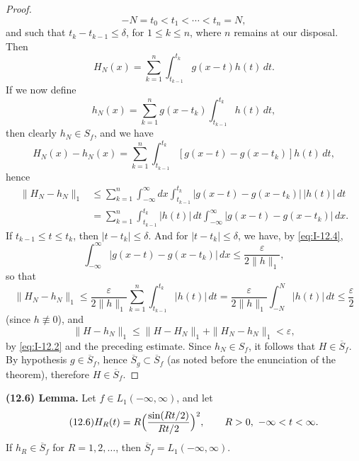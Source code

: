 \begin{proof}
\begin{equation*}
-N=t_0<t_1<\cdots<t_n=N,
\end{equation*}
and such that $t_k-t_{k-1}\le\delta$, for $1\le k\le n$, where $n$ remains at our disposal. Then
\begin{equation*}
H_N(x)=\sum_{k=1}^{n}\int_{t_{k-1}}^{t_k}g(x-t)h(t)\,dt.
\end{equation*}
If we now define
\begin{equation*}
h_N(x)=\sum_{k=1}^{n}g(x-t_k)\int_{t_{k-1}}^{t_k}h(t)\,dt,
\end{equation*}
then clearly $h_N\in S_f$, and we have
\begin{equation*}
H_N(x)-h_N(x)=\sum_{k=1}^{n}\int_{t_{k-1}}^{t_k}[g(x-t)-g(x-t_k)]h(t)\,dt,
\end{equation*}
hence
\begin{equation*}
\begin{aligned}
\|H_N-h_N\|_1 &\le \sum_{k=1}^{n}\int_{-\infty}^{\infty}dx\int_{t_{k-1}}^{t_k}|g(x-t)-g(x-t_k)|\,|h(t)|\,dt\\
&= \sum_{k=1}^{n}\int_{t_{k-1}}^{t_k}|h(t)|\,dt\int_{-\infty}^{\infty}|g(x-t)-g(x-t_k)|\,dx.
\end{aligned}
\end{equation*}
If $t_{k-1}\le t\le t_k$, then $|t-t_k|\le\delta$. And for $|t-t_k|\le\delta$, we have, by \eqref{eq:I-12.4},
\begin{equation*}
\int_{-\infty}^{\infty}|g(x-t)-g(x-t_k)|\,dx\le\frac{\varepsilon}{2\|h\|_1},
\end{equation*}
so that
\begin{equation*}
\|H_N-h_N\|_1\le\frac{\varepsilon}{2\|h\|_1}\sum_{k=1}^{n}\int_{t_{k-1}}^{t_k}|h(t)|\,dt=\frac{\varepsilon}{2\|h\|_1}\int_{-N}^{N}|h(t)|\,dt\le\frac{\varepsilon}{2}
\end{equation*}
(since $h\not\equiv 0$), and
\begin{equation*}
\|H-h_N\|_1\le\|H-H_N\|_1+\|H_N-h_N\|_1<\varepsilon,
\end{equation*}
by \eqref{eq:I-12.2} and the preceding estimate. Since $h_N\in S_f$, it follows that $H\in\overline S_f$. By hypothesis $g\in\overline S_f$, hence $\overline S_g\subset\overline S_f$ (as noted before the enunciation of the theorem), therefore $H\in\overline S_f$.
\end{proof}

\noindent\textbf{(12.6) Lemma.}
Let $f\in L_1(-\infty,\infty)$, and let
\begin{equation}\tag{12.6}\label{eq:I-12.6}
H_R(t)=R\Bigl(\frac{\sin(Rt/2)}{Rt/2}\Bigr)^2,\qquad R>0,\ -\infty<t<\infty.
\end{equation}
If $h_R\in\overline S_f$ for $R=1,2,\ldots$, then $\overline S_f=L_1(-\infty,\infty)$.

